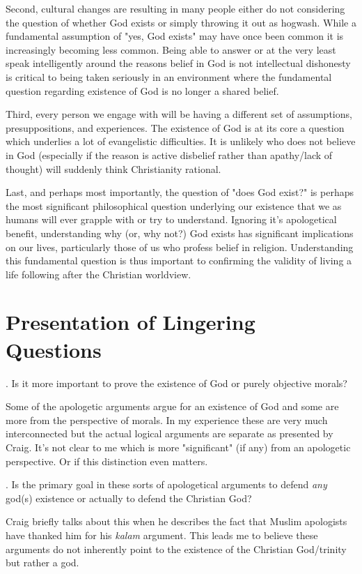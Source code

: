 \documentclass[12pt]{turabian-researchpaper}
\begin{document}
Second, cultural changes are resulting in many people either do not considering the question of whether God exists or simply throwing it out as hogwash. While a fundamental assumption of "yes, God exists" may have once been common it is increasingly becoming less common. Being able to answer or at the very least speak intelligently around the reasons belief in God is not intellectual dishonesty is critical to being taken seriously in an environment where the fundamental question regarding existence of God is no longer a shared belief.

Third, every person we engage with will be having a different set of assumptions, presuppositions, and experiences. The existence of God is at its core a question which underlies a lot of evangelistic difficulties. It is unlikely who does not believe in God (especially if the reason is active disbelief rather than apathy/lack of thought) will suddenly think Christianity rational.

Last, and perhaps most importantly, the question of "does God exist?" is perhaps the most significant philosophical question underlying our existence that we as humans will ever grapple with or try to understand. Ignoring it's apologetical benefit, understanding why (or, why not?) God exists has significant implications on our lives, particularly those of us who profess belief in religion. Understanding this fundamental question is thus important to confirming the validity of living a life following after the Christian worldview.


\section{Presentation of Lingering Questions}

. Is it more important to prove the existence of God or purely objective morals?

Some of the apologetic arguments argue for an existence of God and some are more from the perspective of morals. In my experience these are very much interconnected but the actual logical arguments are separate as presented by Craig. It's not clear to me which is more "significant" (if any) from an apologetic perspective. Or if this distinction even matters.

. Is the primary goal in these sorts of apologetical arguments to defend \textit{any} god(s) existence or actually to defend the Christian God?

Craig briefly talks about this when he describes the fact that Muslim apologists have thanked him for his \textit{kalam} argument\autocite[pg.193]{craig2008reasonable}. This leads me to believe these arguments do not inherently point to the existence of the Christian God/trinity but rather a god. 
\end{document}

